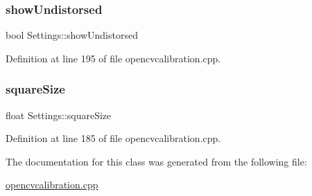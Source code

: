 \mbox{\label{class_settings_a935d6f27ee454e9fee63f8b662f48a06}} 
\subsubsection{\texorpdfstring{showUndistorsed}{showUndistorsed}}
{\footnotesize\ttfamily bool Settings\+::show\+Undistorsed}



Definition at line 195 of file opencvcalibration.\+cpp.

\mbox{\label{class_settings_a6c94708776ad1ce258fc44f2101f5941}} 
\subsubsection{\texorpdfstring{squareSize}{squareSize}}
{\footnotesize\ttfamily float Settings\+::square\+Size}



Definition at line 185 of file opencvcalibration.\+cpp.



The documentation for this class was generated from the following file\+:\begin{DoxyCompactItemize}
\item 
\mbox{\hyperlink{opencvcalibration_8cpp}{opencvcalibration.\+cpp}}\end{DoxyCompactItemize}
